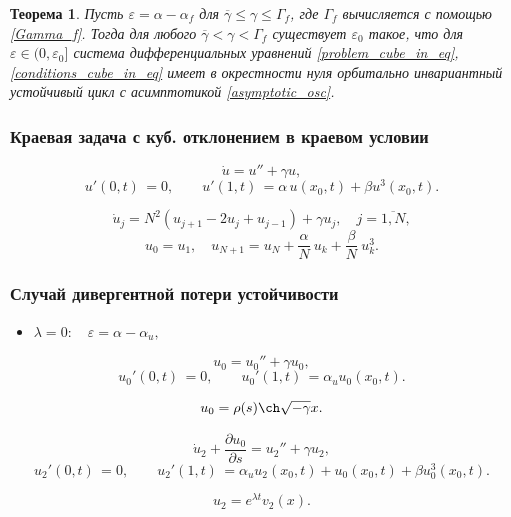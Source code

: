 \documentclass[fullscreen=true, unicode, bookmarks=false]{beamer}
\newtheorem{rustheorem}{Теорема }
\begin{document}
\begin{frame}

\begin{rustheorem}
Пусть $ \varepsilon = \alpha - \alpha_f $ для $ \overline{\gamma} \leqslant \gamma \leqslant \Gamma_f $, где $ \Gamma_f $ вычисляется с помощью \eqref{Gamma_f}. Тогда для любого $ \overline{\gamma} < \gamma < \Gamma_f $ существует $ \varepsilon_0 $ такое, что для $ \varepsilon \in (0, \varepsilon_0] $ система дифференциальных уравнений \eqref{problem_cube_in_eq}, \eqref{conditions_cube_in_eq} имеет в окрестности нуля орбитально инвариантный устойчивый цикл с асимптотикой \eqref{asymptotic_osc}.
\end{rustheorem}

\end{frame}

\begin{frame}
\frametitle{ Краевая задача с куб. отклонением в краевом условии }

$$
\dot u = u'' + \gamma u,	
$$
$$
u'(0, t) \, = 0, \qquad u'(1, t) \, = \alpha\,u(x_0, t) + \beta u^3(x_0, t).
$$

\vfill

$$
\dot{u}_j =  N^2(u_{j+1} - 2u_j + u_{j-1}) + \gamma u_j, \quad j = \overline{1, N},
$$
$$ u_0 = u_1, \quad u_{N+1} = u_N + \frac{\alpha}{N}\:u_k + \frac{\beta}{N}\:u_k^3. $$

\end{frame}

\begin{frame}
\frametitle{ Случай дивергентной потери устойчивости }

\begin{itemize}
\item { $ \lambda = 0: \quad \varepsilon=\alpha-\alpha_u, $
}
\end{itemize}

\vfill

$$
u_0 = u_0'' + \gamma u_0,
$$
$$
u_0'(0, t) \, = 0, \qquad u_0'(1, t) \, = \alpha_u u_0(x_0, t).
$$

$$ u_0 = \rho(s) \ch \sqrt{-\gamma} x. $$

\vfill

$$
\dot u_2 + \frac{\partial u_0}{\partial s} = u_2'' + \gamma u_2,
$$
$$
u_2'(0, t) \, = 0, \qquad u_2'(1, t) \, = \alpha_u u_2(x_0, t) + u_0(x_0, t) + \beta u_0^3(x_0, t).
$$

\vfill

$$ u_2 = e^{\lambda t}v_2(x). $$

\end{frame}
\end{document}
